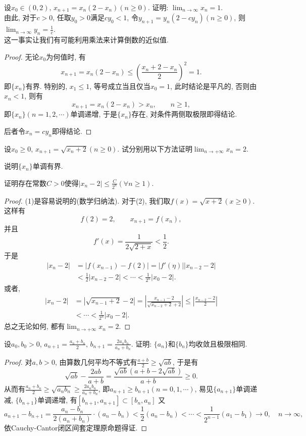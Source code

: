 \begin{quiza}
\woe 设\(x_0\in(0,2),\,x_{n+1}=x_n(2-x_n)(n\geqslant 0)\). 证明: \(\lim_{n\rightarrow\infty}x_n=1\).\\ 由此, 对于\(c>0\), 任取\(y_0>0\)满足\(cy_0<1\), 令\(y_{n+1}=y_{n}(2-cy_n)(n\geqslant 0)\), 则\(\lim_{n\rightarrow\infty}y_n=\frac{1}{c}\).\\这一事实让我们有可能利用乘法来计算倒数的近似值.
\begin{proof}
无论\(x_0\)为何值时, 有\[x_{n+1}=x_n(2-x_n)\leqslant\left(\frac{x_n+2-x_n}{2}\right)^2=1.\]即\(\{x_n\}\)有界. 特别的, \(x_1\leqslant 1\), 等号成立当且仅当\(x_0=1\), 此时结论是平凡的, 否则由\(x_n<1\), 则有\[x_{n+1}=x_n(2-x_n)>x_n,\qquad n\geqslant 1,\]即\(\{x_n\}(n=1,2,\cdots)\)单调递增, 于是\(\{x_n\}\)存在, 对条件两侧取极限即得结论.

后者令\(x_n=cy_n\)即得结论.
\end{proof}
\woe 设\(x_0\geqslant 0\), \(x_{n+1}=\sqrt{x_n+2}(n\geqslant 0)\). 试分别用以下方法证明\(\lim_{n\rightarrow+\infty}x_n=2\).
\begin{quizcs}
\item 说明\(\{x_n\}\)单调有界.
\item 证明存在常数\(C>0\)使得\(|x_n-2|\leqslant\frac{C}{2^n}(\forall n\geqslant 1)\).      
\end{quizcs}
\begin{proof}
    (1)是容易说明的(数学归纳法). 对于(2), 我们取\(f(x)=\sqrt{x+2}(x\geqslant 0)\). 这样有\[f(2)=2,\qquad x_{n+1}=f(x_n),\]并且\[f'(x)=\frac{1}{2\sqrt{2+x}}<\frac{1}{2}.\]于是\[\begin{split}
      |x_n-2|&=\left|f(x_{n-1})-f(2)\right|=\left|f'(\eta)\right||x_{n-2}-2|\\&<\frac{1}{2}|x_{n-2}-2|<\cdots <\frac{1}{2^n}|x_0-2|.
    \end{split}\]
    或者,\[\begin{split}
      |x_n-2|&=|\sqrt{x_{n-1}+2}-2|=\left|\frac{x_{n-1}-2}{\sqrt{x_{n-2}+2}+2}\right|\leqslant \left|\frac{x_{n-2}-2}{2}\right|\\ &<\cdots<\frac{1}{2^n}|x_0-2|.
    \end{split}\]总之无论如何, 都有\(\lim_{n\rightarrow+\infty}x_n=2\).
\end{proof}
\woe 设\(a_0,b_0>0\), \( a_{n+1}=\frac{a_n+b_n}{2},\,b_{n+1}=\frac{2a_nb_n}{a_n+b_n}\). 证明: \(\{a_n\}\)和\(\{b_n\}\)均收敛且极限相同.
\begin{proof}
对\(a, b>0\), 由算数几何平均不等式有\(\frac{a+b}{2}\geqslant\sqrt{ab}\), 于是有\[\sqrt{ab}-\frac{2ab}{a+b}=\frac{\sqrt{ab}\left(a+b-2\sqrt{ab}\right)}{a+b}\geqslant 0.\]从而有\(\frac{a_n+b_n}{2}\geqslant \sqrt{a_nb_n}\geqslant\frac{2a_nb_n}{a_n+b_n}\), 即\(a_{n+1}\geqslant b_{n+1}(n=0,1,\cdots)\), 易见\(\{a_{n+1}\}\)单调递减, \(\{b_{n+1}\}\)单调递增, 有\([b_{n+1},a_{n+1}]\subset [b_{n},a_{n}]\) 又\[a_{n+1}-b_{n+1}=\frac{a_n-b_n}{2(a_n+b_n)}\cdot(a_n-b_n)<\frac{1}{2}(a_n-b_n)<\cdots<\frac{1}{2^{n-1}}(a_1-b_1)\rightarrow 0,\quad n\rightarrow\infty,\]依Cauchy-Cantor闭区间套定理原命题得证.

\end{proof}
\end{quiza}
